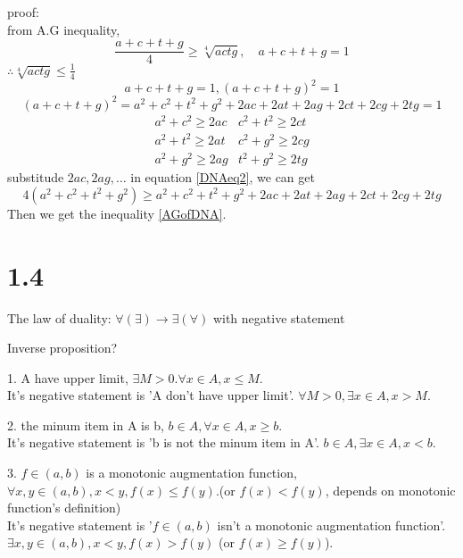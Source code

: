  	proof:\\
 	from A.G inequality,
 	\begin{equation}\label{AGofDNA}
 		\frac{a+c+t+g}{4} \ge \sqrt[4]{actg}, \quad a+c+t+g=1
 	\end{equation}
 	$ \therefore \sqrt[4]{actg} \le \frac{1}{4} $
 	\begin{equation*}
 		a+c+t+g=1, (a+c+t+g)^2=1
 	\end{equation*}
 	\begin{equation}\label{DNAeq2}
 		(a+c+t+g)^2=a^2+c^2+t^2+g^2+2ac+2at+2ag+2ct+2cg+2tg = 1
 	\end{equation}
 	\begin{align}
 		a^2+c^2 \ge 2ac &c^2+t^2 \ge 2ct \\
 		a^2+t^2 \ge 2at &c^2+g^2 \ge 2cg \\
 		a^2+g^2 \ge 2ag &t^2+g^2 \ge 2tg
 	\end{align}
 	substitude $ 2ac,2ag,\dots $ in equation \ref{DNAeq2}, we can get
 	\begin{equation*}
 		4(a^2+c^2+t^2+g^2)\ge a^2+c^2+t^2+g^2+2ac+2at+2ag+2ct+2cg+2tg
 	\end{equation*}
 	Then we get the inequality \ref{AGofDNA}.
 	
 	\section{1.4}
 	The law of duality: 
 	$ \forall(\exists) \rightarrow \exists(\forall) $
 	with negative statement
 	
 	Inverse proposition? 
 	
 	1. A have upper limit, $ \exists M>0. \forall x\in A, x\le M $.\\
 	It's negative statement is 'A don't have upper limit'. $ \forall M >0, \exists x\in A, x>M $.
 	
 	2. the minum item in A is b, $ b\in A,\forall x\in A, x\ge b $.\\
 	It's negative statement is 'b is not the minum item in A'. $ b\in A, \exists x\in A, x< b $.
 	
 	3. $ f\in (a,b) $ is a monotonic augmentation function, $ \forall x,y \in (a,b), x<y, f(x)\le f(y) $.(or $ f(x) < f(y) $, depends on monotonic function's definition)\\
 	It's negative statement is '$ f\in (a,b) $ isn't a monotonic augmentation function'. $ \exists x,y \in (a,b), x<y, f(x)>f(y) $ (or $ f(x)\ge f(y) $).
 	
